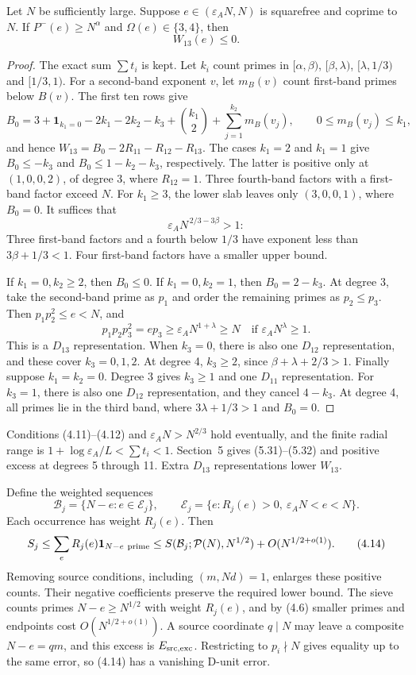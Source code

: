 \begin{lemma}
Let $N$ be sufficiently large.
Suppose $e\in(\varepsilon_A N,N)$ is squarefree and coprime to $N$.
If $P^-(e)\ge N^\alpha$ and $\Omega(e)\in\{3,4\}$, then
\[
 W_{13}(e)\le0.
 \tag{4.9}
\]
\end{lemma}
\begin{proof}
The exact sum $\sum t_i$ is kept.
Let $k_i$ count primes in
$[\alpha,\beta)$, $[\beta,\lambda)$, $[\lambda,1/3)$ and $[1/3,1)$.
For a second-band exponent $v$, let $m_B(v)$ count first-band primes below $B(v)$.
The first ten rows give
\[
 B_0=3+\mathbf1_{k_1=0}-2k_1-2k_2-k_3+
                    {k_1\choose2}+\sum_{j=1}^{k_2}m_B(v_j),
 \qquad0\le m_B(v_j)\le k_1,
 \tag{4.10}
\]
and hence $W_{13}=B_0-2R_{11}-R_{12}-R_{13}$.
The cases $k_1=2$ and $k_1=1$ give
$B_0\le-k_3$ and $B_0\le1-k_2-k_3$, respectively.
The latter is positive only at $(1,0,0,2)$, of degree 3, where $R_{12}=1$.
Three fourth-band factors with a first-band factor exceed $N$.
For $k_1\ge3$, the lower slab leaves only $(3,0,0,1)$, where $B_0=0$.
It suffices that
\[
 \varepsilon_A N^{\,2/3-3\beta}>1:
 \tag{4.11}
\]
Three first-band factors and a fourth below $1/3$ have exponent
less than $3\beta+1/3<1$.
Four first-band factors have a smaller upper bound.

If $k_1=0,k_2\ge2$, then $B_0\le0$.
If $k_1=0,k_2=1$, then $B_0=2-k_3$.
At degree 3, take the second-band prime as $p_1$ and order the remaining primes as $p_2\le p_3$.
Then $p_1p_2^2\le e<N$, and
\[
 p_1p_2p_3^2=ep_3\ge\varepsilon_A N^{1+\lambda}\ge N
              \quad\text{if }\varepsilon_A N^\lambda\ge1.
 \tag{4.12}
\]
This is a $D_{13}$ representation.
When $k_3=0$, there is also one $D_{12}$ representation, and these cover $k_3=0,1,2$.
At degree 4, $k_3\ge2$, since $\beta+\lambda+2/3>1$.
Finally suppose $k_1=k_2=0$.
Degree 3 gives $k_3\ge1$ and one $D_{11}$ representation.
For $k_3=1$, there is also one $D_{12}$ representation, and they cancel $4-k_3$.
At degree 4, all primes lie in the third band, where $3\lambda+1/3>1$ and $B_0=0$.
\end{proof}

Conditions (4.11)--(4.12) and $\varepsilon_A N>N^{2/3}$ hold eventually,
and the finite radial range is $1+\log\varepsilon_A/L<\sum t_i<1$.
Section~5 gives (5.31)--(5.32) and positive excess at degrees 5 through 11.
Extra $D_{13}$ representations lower $W_{13}$.

Define the weighted sequences
\[
 \mathcal B_j=\{N-e:e\in\mathcal E_j\},\qquad
 \mathcal E_j=\{e:R_j(e)>0,\ \varepsilon_A N<e<N\}.
 \tag{4.13}
\]
Each occurrence has weight $R_j(e)$.
Then
\[
S_j\le\sum_eR_j(e)\mathbf1_{N-e\ {\rm prime}}\le S(\mathcal B_j;\mathcal P(N),N^{1/2})+O(N^{1/2+o(1)}).
\tag{4.14}
\]
Removing source conditions, including $(m,Nd)=1$, enlarges these positive counts.
Their negative coefficients preserve the required lower bound.
The sieve counts primes $N-e\ge N^{1/2}$ with weight $R_j(e)$,
and by (4.6) smaller primes and endpoints cost $O(N^{1/2+o(1)})$.
A source coordinate $q\mid N$ may leave a composite $N-e=qm$, and this excess is $E_{\rm src,exc}$.
Restricting to $p_i\nmid N$ gives equality up to the same error,
so (4.14) has a vanishing D-unit error.


